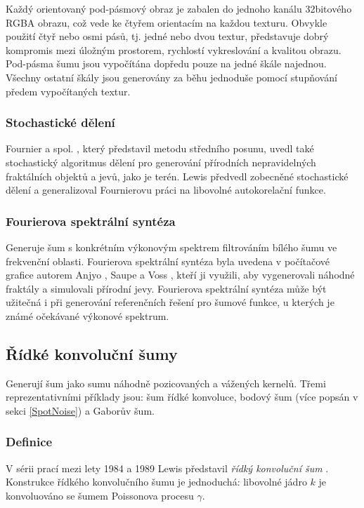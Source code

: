 Každý orientovaný pod-pásmový obraz je zabalen do jednoho kanálu 32bitového RGBA obrazu, což vede ke čtyřem orientacím na každou texturu. Obvykle použití čtyř nebo osmi pásů, tj. jedné nebo dvou textur, představuje dobrý kompromis mezi úložným prostorem, rychlostí vykreslování a kvalitou obrazu. Pod-pásma šumu jsou vypočítána dopředu pouze na jedné škále najednou. Všechny ostatní škály jsou generovány za běhu jednoduše pomocí stupňování předem vypočítaných textur. \cite{Lagae10}

\subsubsection{Stochastické dělení}
Fournier a spol. \cite{Fournier98}, který představil metodu středního posunu, uvedl také stochastický algoritmus dělení pro generování přírodních nepravidelných fraktálních objektů a jevů, jako je terén. Lewis \cite{Lewis86,Lewis87} předvedl zobecněné stochastické dělení a generalizoval Fournierovu práci na libovolné autokorelační funkce.

\subsubsection{Fourierova spektrální syntéza}
\label{Fourier}
Generuje šum s konkrétním výkonovým spektrem filtrováním bílého šumu ve frekvenční oblasti. Fourierova spektrální syntéza byla uvedena v počítačové grafice autorem Anjyo \cite{Anjyo88}, Saupe a Voss \cite{Saupe1988}, kteří ji využili, aby vygenerovali náhodné fraktály a simulovali přírodní jevy. Fourierova spektrální syntéza může být užitečná i při generování referenčních řešení pro šumové funkce, u kterých je známé očekávané výkonové spektrum.

\subsection{Řídké konvoluční šumy}
\label{SparseNoises}
Generují šum jako sumu náhodně pozicovaných a vážených kernelů. Třemi reprezentativními příklady jsou: šum řídké konvoluce, bodový šum (více popsán v sekci \ref{SpotNoise}) a Gaborův šum.

\subsubsection{Definice}
V sérii prací mezi lety 1984 a 1989 Lewis představil \textit{řídký konvoluční šum} \cite{Lewis84, Lewis86, Lewis89}. Konstrukce řídkého konvolučního šumu je jednoduchá: libovolné jádro $k$ je konvoluováno se šumem Poissonova procesu $\gamma$.

